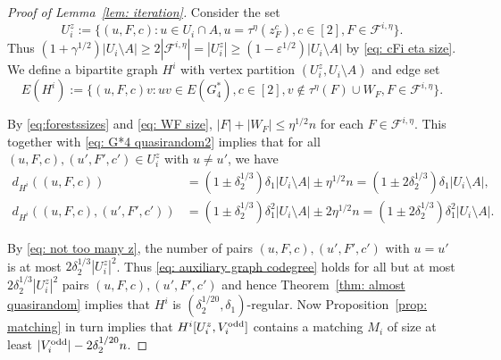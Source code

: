 \documentclass[a4paper, 11pt, reqno]{amsart}
\numberwithin{equation}{section}
\newcommand{\1}{{\rm 1\hspace*{-0.4ex}%
\rule{0.1ex}{1.52ex}\hspace*{0.2ex}}}
\newcommand{\sF}{\mathscr{F}}
\renewcommand{\epsilon}{\varepsilon}
\newcommand{\sm}{\setminus}
\newcommand{\COMMENT}[1]{}
\begin{document}
\begin{proof}[Proof of Lemma~\ref{lem: iteration}]
Consider the set 
$$U^{z}_i:= \{(u,F,c): u\in U_i\cap A, u= \tau^{\eta}(z^c_F), c\in [2], F\in \sF^{i,\eta}\}.$$
Thus $(1+\gamma^{1/2})|U_i\sm A| \geq  2|\sF^{i,\eta}|=|U^{z}_i| \geq (1- \epsilon^{1/2}) |U_i \setminus A|$ by \eqref{eq: cFi eta size}.
We define a bipartite graph $H^i$ with vertex partition $(U^{z}_i,U_i\setminus A )$ 
and edge set
$$E(H^i) := 
\{(u,F,c)v: uv \in E(G^*_4), c\in [2], v\notin \tau^{\eta}(F)\cup W_F, F\in \sF^{i,\eta}\}.$$
\COMMENT{Note that we don't have to avoid edges $(w,F,c)u$ such that $u\in W_F$ because $W_F\subseteq A\cup R$. Thus the term "$\cup W_F$" is technically not necessary here. Felix: I don't care, just include the set.} 
By \eqref{eq:forestssizes} and \eqref{eq: WF size}, 
$|F|+|W_F|\leq  \eta^{1/2} n$ for each $F\in \sF^{i,\eta}$. 
This together with \eqref{eq: G*4 quasirandom2} implies that 
for all $(u,F,c),(u',F',c')\in U_i^z$ with $u\neq u'$, we have
 \begin{align}\label{eq: auxiliary graph degree}
d_{H^i}((u,F,c)) &= (1\pm \delta_2^{1/3})\delta_1 |U_i\setminus A|\pm \eta^{1/2} n 
= (1\pm 2 \delta_2^{1/3})\delta_1|U_i\setminus A|, \\
\label{eq: auxiliary graph codegree}
d_{H^i}((u,F,c),(u',F',c')) &= (1\pm \delta_2^{1/3})\delta_1^2 |U_i\setminus A| \pm 2\eta^{1/2} n
=(1\pm 2 \delta_2^{1/3})\delta_1^{2}|U_i\setminus A|.
 \end{align}

By \eqref{eq: not too many z}, 
the number of pairs $(u,F,c),(u',F',c')$ with $u=u'$ is at most $2\delta_2^{1/3} |U^z_i|^2$.
Thus \eqref{eq: auxiliary graph codegree} holds for all but at most $2\delta_2^{1/3} |U^z_i|^2$ pairs $(u,F,c),(u',F',c')$ 
and hence Theorem~\ref{thm: almost quasirandom} implies that $H^i$ is $(\delta_2^{1/20},\delta_1)$-regular.
Now Proposition~\ref{prop: matching} in turn implies that $H^i[U^z_i,V^{\rm odd}_i]$ contains 
a matching $M_i$ of size at least $|V^{\rm odd}_i| - 2\delta_2^{1/20} n$.


\end{proof}
\end{document}
